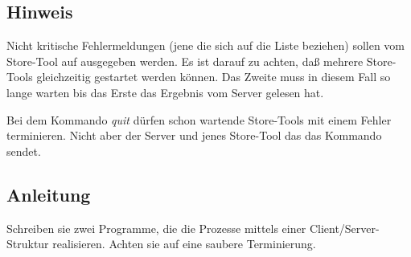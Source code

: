 \subsection*{Hinweis}
Nicht kritische Fehlermeldungen (jene die sich auf die Liste beziehen) sollen vom Store-Tool auf  ausgegeben werden. Es ist darauf zu achten, daß mehrere Store-Tools gleichzeitig gestartet werden können. Das Zweite muss in diesem Fall so lange warten bis das Erste das Ergebnis vom Server gelesen hat.

Bei dem Kommando \emph{quit} dürfen schon wartende Store-Tools mit einem Fehler terminieren. Nicht aber der Server und jenes Store-Tool das das Kommando sendet.

\subsection*{Anleitung}
Schreiben sie zwei Programme, die die Prozesse mittels einer Client/Server-Struktur realisieren. Achten sie auf eine saubere Terminierung.

\osueguidelinesthree


